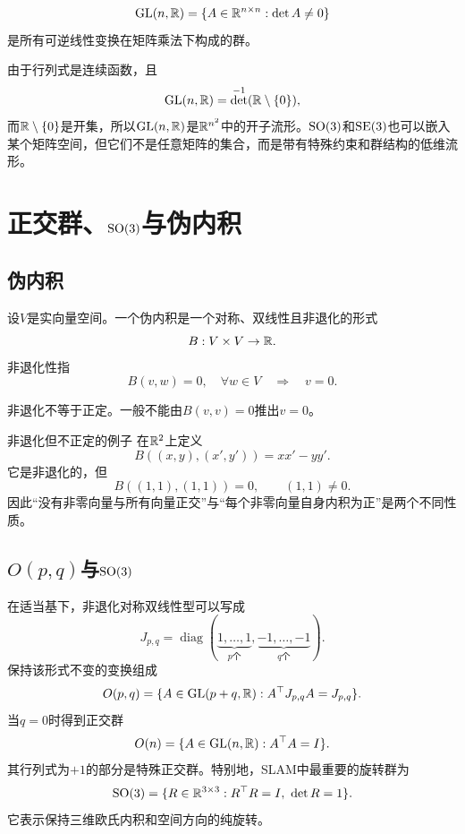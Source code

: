 \begin{definition}[一般线性群]
\[
    \mathrm{GL}(n,\mathbb{R})
    =\{A\in\mathbb{R}^{n\times n}:\det A\neq0\}
\]
是所有可逆线性变换在矩阵乘法下构成的群。
\end{definition}

由于行列式是连续函数，且
\[
    \mathrm{GL}(n,\mathbb{R})
    =\det^{-1}(\mathbb{R}\setminus\{0\}),
\]
而$\mathbb{R}\setminus\{0\}$是开集，所以$\mathrm{GL}(n,\mathbb{R})$是$\mathbb{R}^{n^2}$中的开子流形。$\operatorname{SO}(3)$和$\operatorname{SE}(3)$也可以嵌入某个矩阵空间，但它们不是任意矩阵的集合，而是带有特殊约束和群结构的低维流形。


\section{正交群、$\operatorname{SO}(3)$与伪内积}

\subsection{伪内积}

\begin{definition}[伪内积]
设$V$是实向量空间。一个伪内积是一个对称、双线性且非退化的形式
\[
    B:V\times V\to\mathbb{R}.
\]
非退化性指
\[
    B(v,w)=0,\quad\forall w\in V
    \quad\Longrightarrow\quad v=0.
\]
\end{definition}

非退化不等于正定。一般不能由$B(v,v)=0$推出$v=0$。

\begin{lieexample}{非退化但不正定的例子}
在$\mathbb{R}^2$上定义
\[
    B((x,y),(x',y'))=xx'-yy'.
\]
它是非退化的，但
\[
    B((1,1),(1,1))=0,
    \qquad (1,1)\neq0.
\]
因此“没有非零向量与所有向量正交”与“每个非零向量自身内积为正”是两个不同性质。
\end{lieexample}

\subsection{$O(p,q)$与$\operatorname{SO}(3)$}

在适当基下，非退化对称双线性型可以写成
\[
    J_{p,q}
    =\operatorname{diag}(\underbrace{1,\ldots,1}_{p\text{个}},
    \underbrace{-1,\ldots,-1}_{q\text{个}}).
\]
保持该形式不变的变换组成
\[
    O(p,q)
    =\{A\in\mathrm{GL}(p+q,\mathbb{R}):A^\top J_{p,q}A=J_{p,q}\}.
\]
当$q=0$时得到正交群
\[
    O(n)=\{A\in\mathrm{GL}(n,\mathbb{R}):A^\top A=I\}.
\]
其行列式为$+1$的部分是特殊正交群。特别地，SLAM中最重要的旋转群为
\[
    \SO(3)=\{R\in\R^{3\times3}:R^\top R=I,\ \det R=1\}.
\]
它表示保持三维欧氏内积和空间方向的纯旋转。

